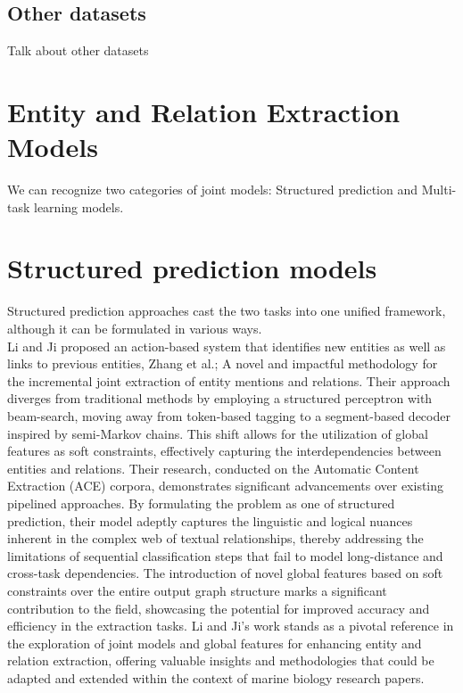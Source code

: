 \subsection{Other datasets}
Talk about other datasets


\section{Entity and Relation Extraction Models}

We can recognize two categories of joint models: Structured prediction and Multi-task learning models.

\section{Structured prediction models}
Structured prediction approaches cast the two tasks into one unified framework, although it can be formulated in various ways.\\
Li and Ji\cite{li-ji-2014-incremental} proposed an action-based system that identifies new entities as well as links to previous entities, Zhang et al.\cite{zhang-etal-2017-end};
A novel and impactful methodology for the incremental joint extraction of entity mentions and relations. Their approach diverges from traditional methods by employing a structured perceptron with beam-search, moving away from token-based tagging to a segment-based decoder inspired by semi-Markov chains. This shift allows for the utilization of global features as soft constraints, effectively capturing the interdependencies between entities and relations. Their research, conducted on the Automatic Content Extraction (ACE) corpora, demonstrates significant advancements over existing pipelined approaches. By formulating the problem as one of structured prediction, their model adeptly captures the linguistic and logical nuances inherent in the complex web of textual relationships, thereby addressing the limitations of sequential classification steps that fail to model long-distance and cross-task dependencies. The introduction of novel global features based on soft constraints over the entire output graph structure marks a significant contribution to the field, showcasing the potential for improved accuracy and efficiency in the extraction tasks. Li and Ji's work stands as a pivotal reference in the exploration of joint models and global features for enhancing entity and relation extraction, offering valuable insights and methodologies that could be adapted and extended within the context of marine biology research papers.\\

